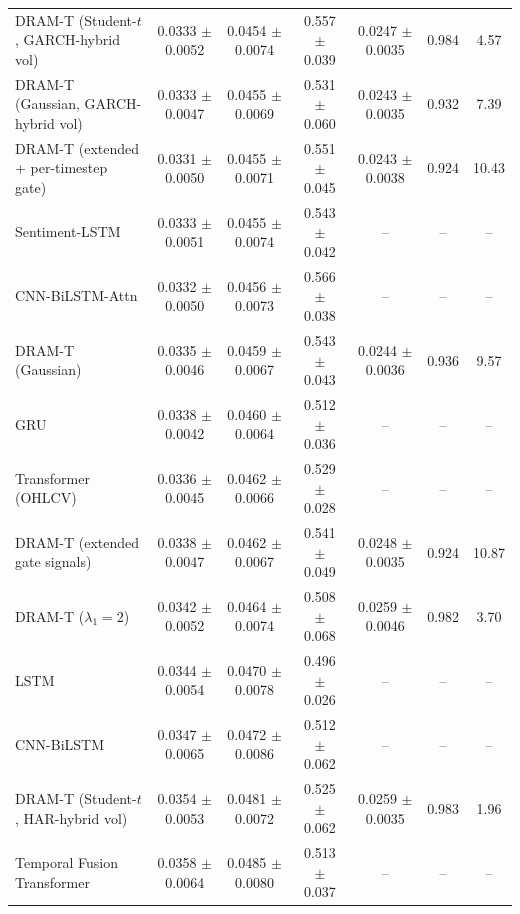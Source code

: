 \begin{table}
\begin{tabular}{lcccccc}
DRAM-T (Student-$t$, GARCH-hybrid vol) & 0.0333 $\pm$ 0.0052 & 0.0454 $\pm$ 0.0074 & 0.557 $\pm$ 0.039 & 0.0247 $\pm$ 0.0035 & 0.984 & 4.57 \\
DRAM-T (Gaussian, GARCH-hybrid vol) & 0.0333 $\pm$ 0.0047 & 0.0455 $\pm$ 0.0069 & 0.531 $\pm$ 0.060 & 0.0243 $\pm$ 0.0035 & 0.932 & 7.39 \\
DRAM-T (extended + per-timestep gate) & 0.0331 $\pm$ 0.0050 & 0.0455 $\pm$ 0.0071 & 0.551 $\pm$ 0.045 & 0.0243 $\pm$ 0.0038 & 0.924 & 10.43 \\
Sentiment-LSTM & 0.0333 $\pm$ 0.0051 & 0.0455 $\pm$ 0.0074 & 0.543 $\pm$ 0.042 & -- & -- & -- \\
CNN-BiLSTM-Attn & 0.0332 $\pm$ 0.0050 & 0.0456 $\pm$ 0.0073 & 0.566 $\pm$ 0.038 & -- & -- & -- \\
DRAM-T (Gaussian) & 0.0335 $\pm$ 0.0046 & 0.0459 $\pm$ 0.0067 & 0.543 $\pm$ 0.043 & 0.0244 $\pm$ 0.0036 & 0.936 & 9.57 \\
GRU & 0.0338 $\pm$ 0.0042 & 0.0460 $\pm$ 0.0064 & 0.512 $\pm$ 0.036 & -- & -- & -- \\
Transformer (OHLCV) & 0.0336 $\pm$ 0.0045 & 0.0462 $\pm$ 0.0066 & 0.529 $\pm$ 0.028 & -- & -- & -- \\
DRAM-T (extended gate signals) & 0.0338 $\pm$ 0.0047 & 0.0462 $\pm$ 0.0067 & 0.541 $\pm$ 0.049 & 0.0248 $\pm$ 0.0035 & 0.924 & 10.87 \\
DRAM-T ($\lambda_1=2$) & 0.0342 $\pm$ 0.0052 & 0.0464 $\pm$ 0.0074 & 0.508 $\pm$ 0.068 & 0.0259 $\pm$ 0.0046 & 0.982 & 3.70 \\
LSTM & 0.0344 $\pm$ 0.0054 & 0.0470 $\pm$ 0.0078 & 0.496 $\pm$ 0.026 & -- & -- & -- \\
CNN-BiLSTM & 0.0347 $\pm$ 0.0065 & 0.0472 $\pm$ 0.0086 & 0.512 $\pm$ 0.062 & -- & -- & -- \\
DRAM-T (Student-$t$, HAR-hybrid vol) & 0.0354 $\pm$ 0.0053 & 0.0481 $\pm$ 0.0072 & 0.525 $\pm$ 0.062 & 0.0259 $\pm$ 0.0035 & 0.983 & 1.96 \\
Temporal Fusion Transformer & 0.0358 $\pm$ 0.0064 & 0.0485 $\pm$ 0.0080 & 0.513 $\pm$ 0.037 & -- & -- & -- \\
\bottomrule
\end{tabular}
\end{table}
